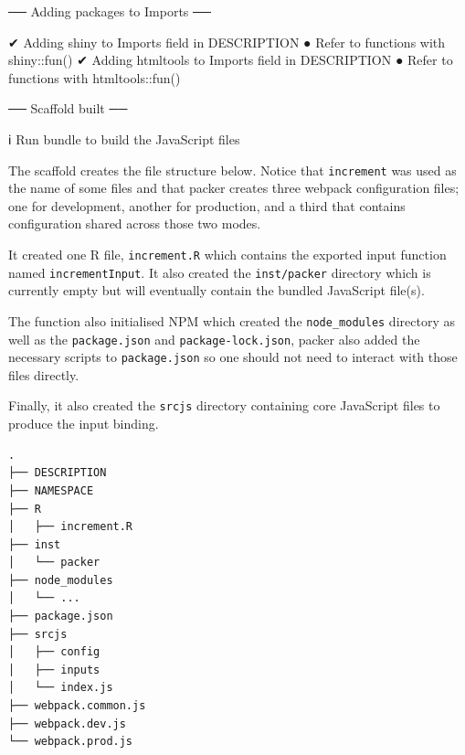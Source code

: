 \documentclass[
]{krantz}
\makeatletter
\newenvironment{Shaded}{\begin{snugshade}}{\end{snugshade}}
\newcommand{\ExtensionTok}[1]{#1}
\newcommand{\FunctionTok}[1]{\textcolor[rgb]{0,0,0}{#1}}
\newcommand{\KeywordTok}[1]{\textcolor[rgb]{0.27,0.27,0.27}{\textbf{#1}}}
\newcommand{\NormalTok}[1]{#1}
\newcommand{\StringTok}[1]{\textcolor[rgb]{0.5,0.5,0.5}{#1}}
\newenvironment{kframe}{%
\medskip{}
\setlength{\fboxsep}{.8em}
 \def\at@end@of@kframe{}%
 \ifinner\ifhmode%
  \def\at@end@of@kframe{\end{minipage}}%
  \begin{minipage}{\columnwidth}%
 \fi\fi%
 \def\FrameCommand##1{\hskip\@totalleftmargin \hskip-\fboxsep
 \colorbox{shadecolor}{##1}\hskip-\fboxsep
     \hskip-\linewidth \hskip-\@totalleftmargin \hskip\columnwidth}%
 \MakeFramed {\advance\hsize-\width
   \@totalleftmargin\z@ \linewidth\hsize
   \@setminipage}}%
 {\par\unskip\endMakeFramed%
 \at@end@of@kframe}
\renewenvironment{Shaded}{\begin{kframe}}{\end{kframe}}
\makeatother
\begin{document}
\begin{Shaded}
\begin{Highlighting}[]
\NormalTok{── }\ExtensionTok{Adding}\NormalTok{ packages to Imports ──}

\NormalTok{✔ }\ExtensionTok{Adding} \StringTok{\textquotesingle{}shiny\textquotesingle{}}\NormalTok{ to Imports field in DESCRIPTION}
\NormalTok{● }\ExtensionTok{Refer}\NormalTok{ to functions with }\KeywordTok{\textasciigrave{}}\FunctionTok{shiny::fun()}\KeywordTok{\textasciigrave{}}
\NormalTok{✔ }\ExtensionTok{Adding} \StringTok{\textquotesingle{}htmltools\textquotesingle{}}\NormalTok{ to Imports field in DESCRIPTION}
\NormalTok{● }\ExtensionTok{Refer}\NormalTok{ to functions with }\KeywordTok{\textasciigrave{}}\FunctionTok{htmltools::fun()}\KeywordTok{\textasciigrave{}}

\NormalTok{── }\ExtensionTok{Scaffold}\NormalTok{ built ──}

\NormalTok{ℹ }\ExtensionTok{Run} \KeywordTok{\textasciigrave{}}\ExtensionTok{bundle}\KeywordTok{\textasciigrave{}}\NormalTok{ to build the JavaScript files}
\end{Highlighting}
\end{Shaded}

The scaffold creates the file structure below. Notice that \texttt{increment} was used as the name of some files and that packer creates three webpack configuration files; one for development, another for production, and a third that contains configuration shared across those two modes.

It created one R file, \texttt{increment.R} which contains the exported input function named \texttt{incrementInput}. It also created the \texttt{inst/packer} directory which is currently empty but will eventually contain the bundled JavaScript file(s).

The function also initialised NPM which created the \texttt{node\_modules} directory as well as the \texttt{package.json} and \texttt{package-lock.json}, packer also added the necessary scripts to \texttt{package.json} so one should not need to interact with those files directly.

Finally, it also created the \texttt{srcjs} directory containing core JavaScript files to produce the input binding.

\begin{verbatim}
.
├── DESCRIPTION
├── NAMESPACE
├── R
│   ├── increment.R
├── inst
│   └── packer
├── node_modules
│   └── ...
├── package.json
├── srcjs
│   ├── config
│   ├── inputs
│   └── index.js
├── webpack.common.js
├── webpack.dev.js
└── webpack.prod.js
\end{verbatim}
\end{document}
